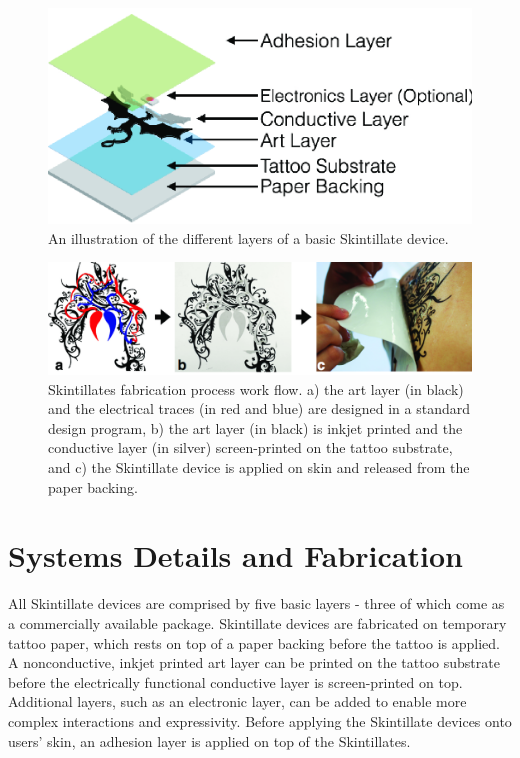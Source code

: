 \documentclass{sigchi}
\begin{document}
\begin{figure}[h]
\centering
\includegraphics[width=0.9\columnwidth]{figures/Figure4}
\caption{An illustration of the different layers of a basic Skintillate device.}
\vspace{-8pt}
\label{fig:layers}
\end{figure}
\begin{figure} [!ht]
\centering
\includegraphics[width=1.0\textwidth]{figures/Figure3}
\caption{Skintillates fabrication process work flow. a) the art layer (in black) and the electrical traces (in red and blue) are designed in a standard design program, b) the art layer (in black) is inkjet printed and the conductive layer (in silver) screen-printed on the tattoo substrate, and c) the Skintillate device is applied on skin and released from  the paper backing.}
\vspace{-8pt}
\label{fig:applicationprocess}
\end{figure}

\section{Systems Details and Fabrication}
 All Skintillate devices are comprised by five basic layers - three of which come as a commercially available package. Skintillate devices are fabricated on temporary tattoo paper, which rests on top of a paper backing before the tattoo is applied. A nonconductive, inkjet printed art layer can be printed on the tattoo substrate before the electrically functional conductive layer is screen-printed on top. Additional layers, such as an electronic layer, can be added to enable more complex interactions and expressivity. Before applying the Skintillate devices onto users' skin, an adhesion layer is applied on top of the Skintillates. 
\end{document}
